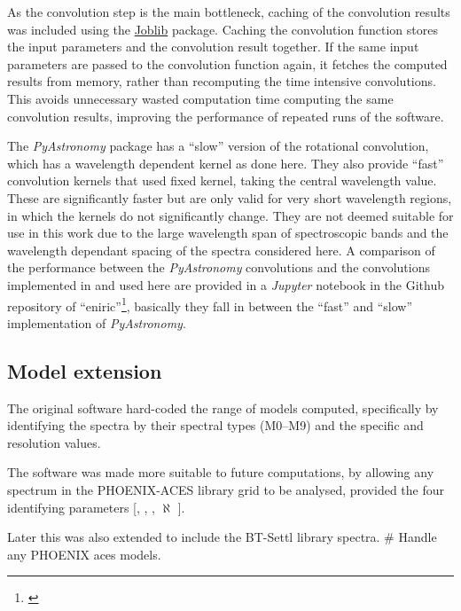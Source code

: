As the convolution step is the main bottleneck, caching of the convolution results was included using the \href{https://joblib.readthedocs.io}{Joblib} package.
Caching the convolution function stores the input parameters and the convolution result together.
If the same input parameters are passed to the convolution function again, it fetches the computed results from memory, rather than recomputing the time intensive convolutions.
This avoids unnecessary wasted computation time computing the same convolution results, improving the performance of repeated runs of the software.

The \emph{PyAstronomy} package has a ``slow'' version of the rotational convolution, which has a wavelength dependent kernel as done here.
They also provide ``fast'' convolution kernels that used fixed kernel, taking the central wavelength value.
These are significantly faster but are only valid for very short wavelength regions, in which the kernels do not significantly change.
They are not deemed suitable for use in this work due to the large wavelength span of spectroscopic bands and the wavelength dependant spacing of the spectra considered here.
A comparison of the performance between the \emph{PyAstronomy} convolutions and the convolutions implemented in \eniric{} and used here are provided in a \emph{Jupyter} notebook in the Github repository of ``eniric''\footnote{\href{https://github.com/jason-neal/eniric/blob/master/docs/Notebooks/Convolution_speeds.ipynb}{}}, basically they fall in between the ``fast'' and ``slow'' implementation of \emph{PyAstronomy}.



\subsection{Model extension}
\label{subsec:eniric_model_extesion}
The original software hard-coded the range of models computed, specifically by identifying the spectra by their spectral types (M0--M9) and the specific \Vsini{} and resolution values.

The software was made more suitable to future computations, by allowing any spectrum in the {PHOENIX-ACES} library grid to be analysed, provided the four identifying parameters [\Teff, \Logg, \feh{}, $\aleph$ \alphafe{}].

Later this was also extended to include the {BT-Settl} library spectra.
\# Handle any {PHOENIX} aces models.


